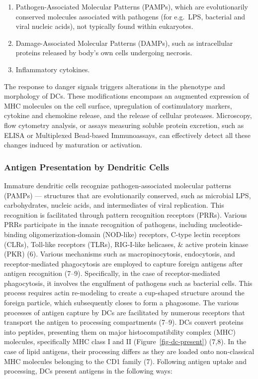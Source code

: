 \documentclass[
]{article}
\begin{document}
\begin{enumerate}
\def\labelenumi{\arabic{enumi}.}
\item
  Pathogen-Associated Molecular Patterns (PAMPs), which are
  evolutionarily conserved molecules associated with pathogens (for
  e.g.~LPS, bacterial and viral nucleic acids), not typically found
  within eukaryotes.
\item
  Damage-Associated Molecular Patterns (DAMPs), such as intracellular
  proteins released by body's own cells undergoing necrosis.
\item
  Inflammatory cytokines.
\end{enumerate}

The response to danger signals triggers alterations in the phenotype and
morphology of DCs. These modifications encompass an augmented expression
of MHC molecules on the cell surface, upregulation of costimulatory
markers, cytokine and chemokine release, and the release of cellular
proteases. Microscopy, flow cytometry analysis, or assays measuring
soluble protein excretion, such as ELISA or Multiplexed Bead-based
Immunoassays, can effectively detect all these changes induced by
maturation or activation.

\subsubsection{Antigen Presentation by Dendritic
Cells}\label{antigen-presentation-by-dendritic-cells}

Immature dendritic cells recognize pathogen-associated molecular
patterns (PAMPs) --- structures that are evolutionarily conserved, such
as microbial LPS, carbohydrates, nucleic acids, and intermediates of
viral replication. This recognition is facilitated through pattern
recognition receptors (PRRs). Various PRRs participate in the innate
recognition of pathogens, including nucleotide-binding
oligomerization-domain (NOD-like) receptors, C-type lectin receptors
(CLRs), Toll-like receptors (TLRs), RIG-I-like helicases, \& active
protein kinase (PKR) (6). Various mechanisms such as macropinocytosis,
endocytosis, and receptor-mediated phagocytosis are employed to capture
foreign antigens after antigen recognition (7--9). Specifically, in the
case of receptor-mediated phagocytosis, it involves the engulfment of
pathogens such as bacterial cells. This process requires actin
re-modeling to create a cup-shaped structure around the foreign
particle, which subsequently closes to form a phagosome. The various
processes of antigen capture by DCs are facilitated by numerous
receptors that transport the antigen to processing compartments (7--9).
DCs convert proteins into peptides, presenting them on major
histocompatibility complex (MHC) molecules, specifically MHC class I and
II (Figure~\ref{fig-dc-present}) (7,8). In the case of lipid antigens,
their processing differs as they are loaded onto non-classical MHC
molecules belonging to the CD1 family (7). Following antigen uptake and
processing, DCs present antigens in the following ways:
\end{document}
